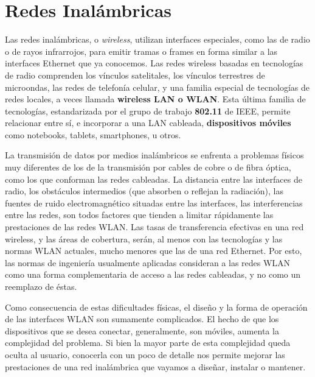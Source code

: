 \section {Redes Inalámbricas}


Las redes inalámbricas, o \textit{wireless}, utilizan interfaces especiales, como las de radio o de rayos infrarrojos, para emitir tramas o frames en forma similar a las interfaces Ethernet que ya conocemos. Las redes wireless basadas en tecnologías de radio comprenden los vínculos satelitales, los vínculos terrestres de microondas, las redes de telefonía celular, y una familia especial de tecnologías de redes locales, a veces llamada \textbf{wireless LAN o WLAN}. Esta última familia de tecnologías, estandarizada por el grupo de trabajo  \textbf{802.11} de IEEE, permite relacionar entre sí, e incorporar a una LAN cableada, \textbf{dispositivos móviles} como notebooks, tablets, smartphones, u otros.

 La transmisión de datos por medios inalámbricos se enfrenta a problemas físicos muy diferentes de los de la transmisión por cables de cobre o de fibra óptica, como los que conforman las redes cableadas. La distancia entre las interfaces de radio, los obstáculos intermedios (que absorben o reflejan la radiación), las fuentes de ruido electromagnético situadas entre las interfaces, las interferencias entre las redes, son todos factores que tienden a limitar rápidamente las prestaciones de las redes WLAN. Las tasas de transferencia efectivas en una red wireless, y las áreas de cobertura, serán, al menos con las tecnologías y las normas WLAN actuales, mucho menores que las de una red Ethernet. Por esto, las normas de ingeniería usualmente aplicadas consideran a las redes WLAN como una forma complementaria de acceso a las redes cableadas, y no como un reemplazo de éstas.

Como consecuencia de estas dificultades físicas, el diseño y la forma de operación de las interfaces WLAN son sumamente complicados. El hecho de que los dispositivos que se desea conectar, generalmente, son móviles, aumenta la complejidad del problema. Si bien la mayor parte de esta complejidad queda oculta al usuario, conocerla con un poco de detalle nos permite mejorar las prestaciones de una red inalámbrica que vayamos a diseñar, instalar o mantener. 

